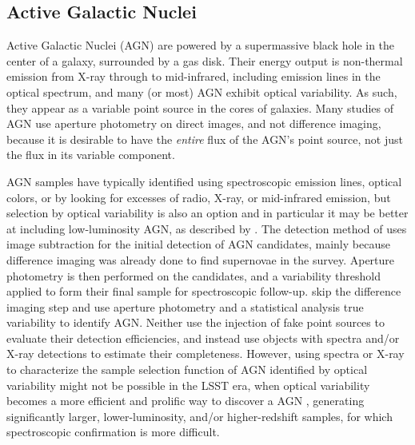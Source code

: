 \subsection{Active Galactic Nuclei}\label{ssec:sci_agn}

Active Galactic Nuclei (AGN) are powered by a supermassive black hole in the center of a galaxy, surrounded by a gas disk.
Their energy output is non-thermal emission from X-ray through to mid-infrared, including emission lines in the optical spectrum, and many (or most) AGN exhibit optical variability.
As such, they appear as a variable point source in the cores of galaxies.
Many studies of AGN use aperture photometry on direct images, and not difference imaging, because it is desirable to have the {\it entire} flux of the AGN's point source, not just the flux in its variable component.

AGN samples have typically identified using spectroscopic emission lines, optical colors, or by looking for excesses of radio, X-ray, or mid-infrared emission, but selection by optical variability is also an option and in particular it may be better at including low-luminosity AGN, as described by \cite[e.g.,][]{2008A&A...488...73T,2010ApJ...723..737V}.
The detection method of \cite{2008A&A...488...73T} uses image subtraction for the initial detection of AGN candidates, mainly because difference imaging was already done to find supernovae in the survey.
Aperture photometry is then performed on the candidates, and a variability threshold applied to form their final sample for spectroscopic follow-up.
\cite{2010ApJ...723..737V} skip the difference imaging step and use aperture photometry and a statistical analysis true variability to identify AGN.
Neither use the injection of fake point sources to evaluate their detection efficiencies, and instead use objects with spectra and/or X-ray detections to estimate their completeness.
However, using spectra or X-ray to characterize the sample selection function of AGN identified by optical variability might not be possible in the LSST era, when optical variability becomes a more efficient and prolific way to discover a AGN \cite[e.g.,][]{2014ApJ...782...37C}, generating significantly larger, lower-luminosity, and/or higher-redshift samples, for which spectroscopic confirmation is more difficult.

